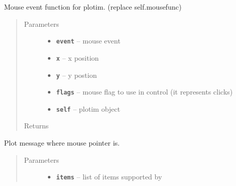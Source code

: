 \documentclass[letterpaper,10pt,english]{sphinxmanual}
\begin{document}
\begin{fulllineitems}
\begin{fulllineitems}
\begin{quote}
\begin{description}
\end{description}\end{quote}

\end{fulllineitems}


\begin{fulllineitems}
\label{RRtoolbox.lib:RRtoolbox.lib.plotter.plotim.onmouse}
Mouse event function for plotim. (replace self.mousefunc)
\begin{quote}\begin{description}
\item[{Parameters}] \leavevmode\begin{itemize}
\item {} 
\textbf{\texttt{event}} -- mouse event

\item {} 
\textbf{\texttt{x}} -- x position

\item {} 
\textbf{\texttt{y}} -- y postion

\item {} 
\textbf{\texttt{flags}} -- mouse flag to use in control (it represents clicks)

\item {} 
\textbf{\texttt{self}} -- plotim object

\end{itemize}

\item[{Returns}] \leavevmode


\end{description}\end{quote}

\end{fulllineitems}


\begin{fulllineitems}
\label{RRtoolbox.lib:RRtoolbox.lib.plotter.plotim.plotatpointer}
Plot message where mouse pointer is.
\begin{quote}\begin{description}
\item[{Parameters}] \leavevmode\begin{itemize}
\item {} 
\textbf{\texttt{items}} -- list of items supported by 


\end{itemize}
\end{description}
\end{quote}
\end{fulllineitems}
\end{fulllineitems}
\end{document}

